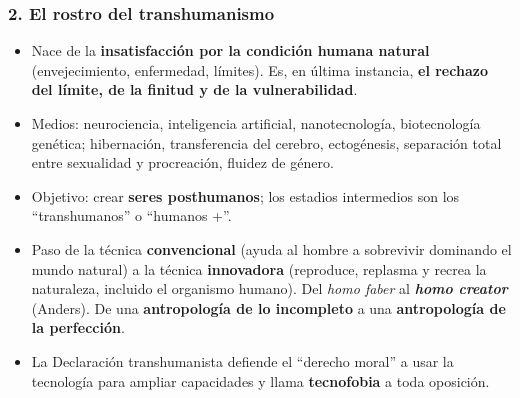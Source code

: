 \documentclass[10pt,a4paper]{article}
\begin{document}
\subsubsection{2. El rostro del transhumanismo}
\begin{itemize}
\item Nace de la \textbf{insatisfacción por la condición humana natural} (envejecimiento, enfermedad, límites). Es, en última instancia, \textbf{el rechazo del límite, de la finitud y de la vulnerabilidad}.
\item Medios: neurociencia, inteligencia artificial, nanotecnología, biotecnología genética; hibernación, transferencia del cerebro, ectogénesis, separación total entre sexualidad y procreación, fluidez de género.
\item Objetivo: crear \textbf{seres posthumanos}; los estadios intermedios son los ``transhumanos'' o ``humanos +''.
\item Paso de la técnica \textbf{convencional} (ayuda al hombre a sobrevivir dominando el mundo natural) a la técnica \textbf{innovadora} (reproduce, replasma y recrea la naturaleza, incluido el organismo humano). Del \textit{homo faber} al \textbf{\textit{homo creator}} (Anders). De una \textbf{antropología de lo incompleto} a una \textbf{antropología de la perfección}.
\item La Declaración transhumanista defiende el ``derecho moral'' a usar la tecnología para ampliar capacidades y llama \textbf{tecnofobia} a toda oposición.
\end{itemize}
\end{document}

